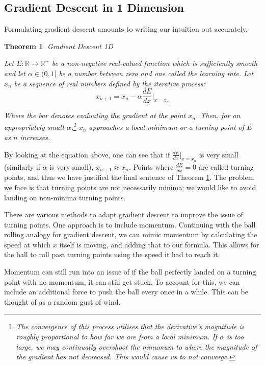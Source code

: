 \documentclass[a4paper]{article}
\theoremstyle{plain} %
\newtheorem{theorem}{Theorem}[section]
\theoremstyle{definition} %
\numberwithin{equation}{subsection}
\newcommand{\R}{\mathbb{R}}
\begin{document}
\subsection{Gradient Descent in 1 Dimension}

Formulating gradient descent amounts to writing our intuition out accurately.

\begin{theorem} \label{th:gradient-descent-1d}
  Gradient Descent 1D

  Let $E:\R \rightarrow \R^+$ be a non-negative real-valued function which is sufficiently smooth
  and let $\alpha \in (0,1]$ be a number between zero and one called the learning rate. 
  Let $x_n$ be a sequence of real numbers defined by the iterative process:
  \[ x_{n+1} = x_n - \alpha \frac{dE}{dx}\bigg|_{x=x_n}\]

  Where the bar denotes evaluating the gradient at the point $x_n$. Then, for an appropriately small $\alpha$,\footnote{The convergence of this process utilises that the derivative's magnitude is roughly proportional to how far we are from a local minimum. If $\alpha$ is too large, we may continually overshoot the minumum to where the magnitude of the gradient has not decreased. This would cause us to not converge.} 
  $x_n$ approaches a local minimum or a turning point of $E$ as $n$ increases.
\end{theorem}

By looking at the equation above, one can see that if $\frac{dE}{dx}\big|_{x=x_n}$ is very small (similarly if $\alpha$ is very small), $x_{n+1} \approx x_n$.
Points where $\frac{dE}{dx}=0$ are called turning points, and thus we have justified the final sentence of Theorem \ref{th:gradient-descent-1d}. 
The problem we face is that turning points are not necessarily minima; we would like to avoid landing on non-minima turning points.

There are various methods to adapt gradient descent to improve the issue of turning points. One approach is to include momentum. 
Continuing with the ball rolling analogy for gradient descent, we can mimic momentum by calculating the speed at which $x$ itself is moving, 
and adding that to our formula. This allows for the ball to roll past turning points using the speed it had to reach it.

Momentum can still run into an issue of if the ball perfectly landed on a turning point with no momentum, it can still get stuck. 
To account for this, we can include an additional force to push the ball every once in a while. This can be thought of as a random gust of wind.
\end{document}
